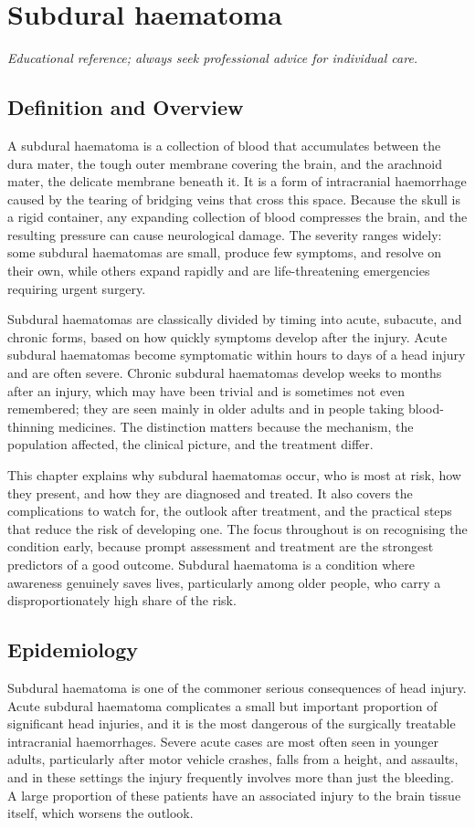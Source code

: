 \chapter{Subdural haematoma}

\medskip
\noindent\textit{Educational reference; always seek professional advice for individual care.}

\section*{Definition and Overview}
A subdural haematoma is a collection of blood that accumulates between the dura mater, the tough outer membrane covering the brain, and the arachnoid mater, the delicate membrane beneath it. It is a form of intracranial haemorrhage caused by the tearing of bridging veins that cross this space. Because the skull is a rigid container, any expanding collection of blood compresses the brain, and the resulting pressure can cause neurological damage. The severity ranges widely: some subdural haematomas are small, produce few symptoms, and resolve on their own, while others expand rapidly and are life-threatening emergencies requiring urgent surgery.

Subdural haematomas are classically divided by timing into acute, subacute, and chronic forms, based on how quickly symptoms develop after the injury. Acute subdural haematomas become symptomatic within hours to days of a head injury and are often severe. Chronic subdural haematomas develop weeks to months after an injury, which may have been trivial and is sometimes not even remembered; they are seen mainly in older adults and in people taking blood-thinning medicines. The distinction matters because the mechanism, the population affected, the clinical picture, and the treatment differ.

This chapter explains why subdural haematomas occur, who is most at risk, how they present, and how they are diagnosed and treated. It also covers the complications to watch for, the outlook after treatment, and the practical steps that reduce the risk of developing one. The focus throughout is on recognising the condition early, because prompt assessment and treatment are the strongest predictors of a good outcome. Subdural haematoma is a condition where awareness genuinely saves lives, particularly among older people, who carry a disproportionately high share of the risk.

\section*{Epidemiology}
Subdural haematoma is one of the commoner serious consequences of head injury. Acute subdural haematoma complicates a small but important proportion of significant head injuries, and it is the most dangerous of the surgically treatable intracranial haemorrhages. Severe acute cases are most often seen in younger adults, particularly after motor vehicle crashes, falls from a height, and assaults, and in these settings the injury frequently involves more than just the bleeding. A large proportion of these patients have an associated injury to the brain tissue itself, which worsens the outlook.

